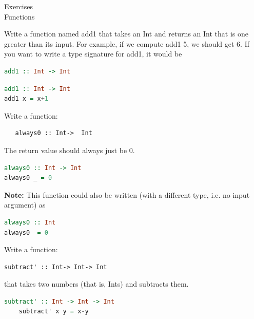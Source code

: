 \documentclass{article}
\newcommand\ExTitle{Functions}
\newcommand\fullExTitle{Exercises \\ \ExTitle }
\begin{document}
\begin{Huge}
	\begin{center}
	\fullExTitle
	\end{center}
\end{Huge}

\vspace{1cm}

\begin{Exercise}
  Write a function named add1 that takes an Int and returns an Int that is one greater
than its input. For example, if we compute add1 5, we should get 6. If you want to
write a type signature for add1, it would be 
\begin{lstlisting}[language=Haskell]
add1 :: Int -> Int
\end{lstlisting} 

\end{Exercise}
\begin{Answer}
\begin{lstlisting}[language=Haskell]
add1 :: Int -> Int
add1 x = x+1  
\end{lstlisting}
\end{Answer}

\begin{Exercise}
Write a function: 
\begin{lstlisting}
   always0 :: Int->  Int
\end{lstlisting}   
The return value should always just be 0.
\end{Exercise}
\begin{Answer}
  \begin{lstlisting}[language=Haskell]
always0 :: Int -> Int
always0 _ = 0
  \end{lstlisting}
\textbf{Note:} This function could also be written (with a different type, i.e. no input argument) as 
\begin{lstlisting}[language=Haskell]
always0 :: Int
always0  = 0
    \end{lstlisting}
  \end{Answer}
  
\begin{Exercise}
  Write a function:
  \begin{lstlisting}
subtract' :: Int-> Int-> Int
  \end{lstlisting}   
  that takes two numbers (that is, Ints) and subtracts them.
\end{Exercise}
\begin{Answer}
  \begin{lstlisting}[language=Haskell]
    subtract' :: Int -> Int -> Int
    subtract' x y = x-y
  \end{lstlisting} 
  
  \end{Answer}
  
\end{document}
